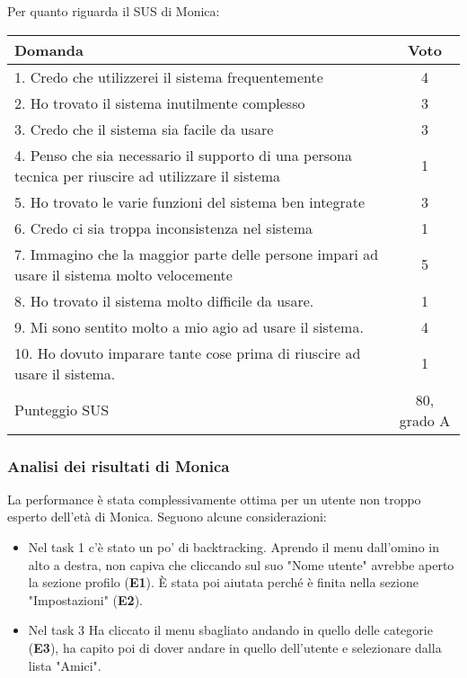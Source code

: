 \documentclass[../Report.tex]{subfiles}
\begin{document}
    Per quanto riguarda il SUS di Monica:
    \begin{table}[H]
        \begin{tabular}{|p{10cm}|c|}
            \hline
            \textbf{Domanda} & \textbf{Voto}\\
            \hline
            1. \cellcolor{green} Credo che utilizzerei il sistema frequentemente & 4 \\
            \hline
            2. \cellcolor{red} Ho trovato il sistema inutilmente complesso & 3  \\
            \hline
            3. \cellcolor{green} Credo che il sistema sia facile da usare & 3 \\
            \hline
            4. \cellcolor{red} Penso che sia necessario il supporto di una persona tecnica per riuscire ad utilizzare il sistema & 1 \\
            \hline
            5. \cellcolor{green} Ho trovato le varie funzioni del sistema ben integrate & 3 \\
            \hline
            6. \cellcolor{red} Credo ci sia troppa inconsistenza nel sistema & 1 \\
            \hline
            7. \cellcolor{green} Immagino che la maggior parte delle persone impari ad usare il sistema molto velocemente & 5 \\
            \hline
            8. \cellcolor{red} Ho trovato il sistema molto difficile da usare. & 1 \\
            \hline
            9. \cellcolor{green} Mi sono sentito molto a mio agio ad usare il sistema. & 4 \\
            \hline
            10. \cellcolor{red} Ho dovuto imparare tante cose prima di riuscire ad usare il sistema. & 1 \\ 
            \hline
            Punteggio SUS & 80, grado A \\
            \hline
        \end{tabular}
    \end{table}

    \subsubsection{Analisi dei risultati di Monica}
    La performance è stata complessivamente ottima per un utente non troppo esperto dell'età di Monica. Seguono alcune considerazioni:
    \begin{itemize}
        \item Nel task 1 c'è stato un po' di backtracking. Aprendo il menu dall'omino in alto a destra, non capiva che cliccando sul suo "Nome utente" avrebbe aperto la sezione profilo (\textbf{E1}). È stata poi aiutata perché è finita nella sezione "Impostazioni" (\textbf{E2}). 
        \item Nel task 3 Ha cliccato il menu sbagliato andando in quello delle categorie (\textbf{E3}), ha capito poi di dover andare in quello dell'utente e selezionare dalla lista "Amici". 
    \end{itemize}
\end{document}
